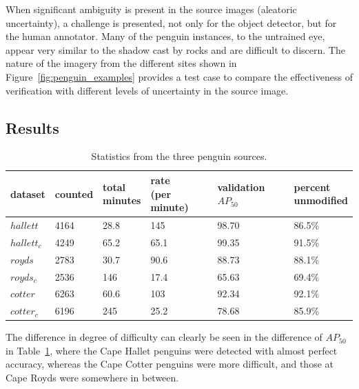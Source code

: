 When significant ambiguity is present in the source images (aleatoric uncertainty), a challenge is presented, not only for the object detector, but for the human annotator. Many of the penguin instances, to the untrained eye, appear very similar to the shadow cast by rocks and are difficult to discern. The nature of the imagery from the different sites shown in Figure~\ref{fig:penguin_examples} provides a test case to compare the effectiveness of verification with different levels of uncertainty in the source image. 


\subsection{Results}
\label{sec:penguin_results}

\begin{table}[ht!]
  \centering
    \caption{Statistics from the three penguin sources. }
\begin{tabular}{llllll}
dataset     & counted & \shortstack{total  \\ minutes} & \shortstack{rate \\ (per minute)} & \shortstack {validation \\  $AP_{50}$} & \shortstack{percent \\ unmodified} \\
\toprule
$hallett$   & 4164    & 28.8          & 145               & 98.70     & 86.5\%   \\
$hallett_c$ & 4249    & 65.2          & 65.1              & 99.35     & 91.5\%   \\
$royds$     & 2783    & 30.7          & 90.6              & 88.73     & 88.1\%   \\
$royds_c$   & 2536    & 146           & 17.4              & 65.63     & 69.4\%   \\
$cotter$    & 6263    & 60.6          & 103               & 92.34     & 92.1\%   \\
$cotter_c$  & 6196    & 245           & 25.2              & 78.68     & 85.9\%  \\
\bottomrule
\end{tabular}

\label{tab:penguin_statistics}
\end{table}

The difference in degree of difficulty can clearly be seen in the difference of $AP_{50}$ in Table~\ref{tab:penguin_statistics}, where the Cape Hallet penguins were detected with almost perfect accuracy, whereas the Cape Cotter penguins were more difficult, and those at Cape Royds were somewhere in between. 

